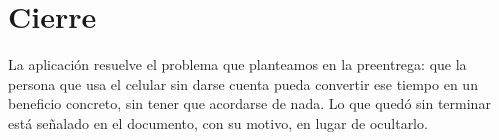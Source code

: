 \section{Cierre}

La aplicación resuelve el problema que planteamos en la preentrega: que la persona que usa el celular
sin darse cuenta pueda convertir ese tiempo en un beneficio concreto, sin tener que acordarse de nada.
Lo que quedó sin terminar está señalado en el documento, con su motivo, en lugar de ocultarlo.

